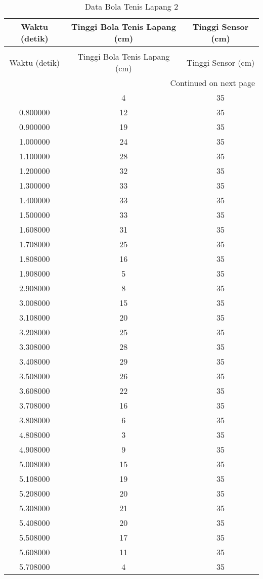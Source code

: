 \begin{longtable}[htbp]{|c|c|c|}
\caption{Data Bola Tenis Lapang 2} \\
\hline
Waktu (detik) & Tinggi Bola Tenis Lapang (cm) & Tinggi Sensor (cm) \\ \hline
\endfirsthead
\caption[]{Data Bola Tenis Lapang 2} \\
\hline
Waktu (detik) & Tinggi Bola Tenis Lapang (cm) & Tinggi Sensor (cm) \\ \hline
\endhead
\multicolumn{3}{r}{Continued on next page} \\
\endfoot
\endlastfoot
0.700000 & 4 & 35 \\ \hline
0.800000 & 12 & 35 \\ \hline
0.900000 & 19 & 35 \\ \hline
1.000000 & 24 & 35 \\ \hline
1.100000 & 28 & 35 \\ \hline
1.200000 & 32 & 35 \\ \hline
1.300000 & 33 & 35 \\ \hline
1.400000 & 33 & 35 \\ \hline
1.500000 & 33 & 35 \\ \hline
1.608000 & 31 & 35 \\ \hline
1.708000 & 25 & 35 \\ \hline
1.808000 & 16 & 35 \\ \hline
1.908000 & 5 & 35 \\ \hline
2.908000 & 8 & 35 \\ \hline
3.008000 & 15 & 35 \\ \hline
3.108000 & 20 & 35 \\ \hline
3.208000 & 25 & 35 \\ \hline
3.308000 & 28 & 35 \\ \hline
3.408000 & 29 & 35 \\ \hline
3.508000 & 26 & 35 \\ \hline
3.608000 & 22 & 35 \\ \hline
3.708000 & 16 & 35 \\ \hline
3.808000 & 6 & 35 \\ \hline
4.808000 & 3 & 35 \\ \hline
4.908000 & 9 & 35 \\ \hline
5.008000 & 15 & 35 \\ \hline
5.108000 & 19 & 35 \\ \hline
5.208000 & 20 & 35 \\ \hline
5.308000 & 21 & 35 \\ \hline
5.408000 & 20 & 35 \\ \hline
5.508000 & 17 & 35 \\ \hline
5.608000 & 11 & 35 \\ \hline
5.708000 & 4 & 35 \\ \hline
\end{longtable}
